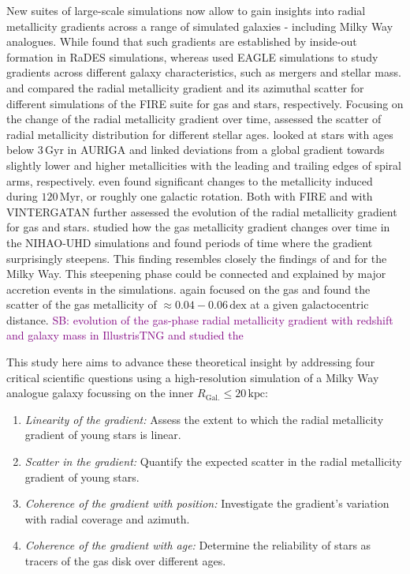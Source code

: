 \documentclass[fleqn,usenatbib]{mnras}
\newcommand{\SB}[1]{{\textcolor{purple}{SB: #1}}}
\begin{document}
New suites of large-scale simulations now allow to gain insights into radial metallicity gradients across a range of simulated galaxies - including Milky Way analogues. While \citet{Pilkington2012} found that such gradients are established by inside-out formation in RaDES simulations, whereas \citet{Tissera2019} used EAGLE simulations to study gradients across different galaxy characteristics, such as mergers and stellar mass. \citet{Bellardini2021} and \citet{Bellardini2022, Graf2024} compared the radial metallicity gradient and its azimuthal scatter for different simulations of the FIRE suite for gas and stars, respectively. Focusing on the change of the radial metallicity gradient over time, \citet{Grand2015} assessed the scatter of radial metallicity distribution for different stellar ages. \citet{Grand2016} looked at stars with ages below $3\,\mathrm{Gyr}$ in AURIGA and linked deviations from a global gradient towards slightly lower and higher metallicities with the leading and trailing edges of spiral arms, respectively. \citet{Grand2016} even found significant changes to the metallicity induced during $120\,\mathrm{Myr}$, or roughly one galactic rotation. Both \citet[][see their Fig. 6]{Ma2017} with FIRE and \citet[see their Fig. 9][]{Agertz2021} with VINTERGATAN further assessed the evolution of the radial metallicity gradient for gas and stars. \citet{Buck2023} studied how the gas metallicity gradient changes over time in the NIHAO-UHD simulations and found periods of time where the gradient surprisingly steepens. This finding resembles closely the findings of \citet{Lu2022} and \citet{Ratcliffe2023} for the Milky Way. This steepening phase could be connected and explained by major accretion events in the simulations. \citet{Khoperskov2023e} again focused on the gas and found the scatter of the gas metallicity of $\approx 0.04-0.06\,\mathrm{dex}$ at a given galactocentric distance. \SB{\citet{Hemler2021} evolution of the gas-phase radial metallicity gradient with redshift and galaxy mass in IllustrisTNG and \citet{Garcia2023} studied the }

This study here aims to advance these theoretical insight by addressing four critical scientific questions using a high-resolution simulation of a Milky Way analogue galaxy focussing on the inner $R_\mathrm{Gal.} \leq 20\,\mathrm{kpc}$:
\begin{enumerate}
\item \textit{Linearity of the gradient:} Assess the extent to which the radial metallicity gradient of young stars is linear.
\item \textit{Scatter in the gradient:} Quantify the expected scatter in the radial metallicity gradient of young stars.
\item \textit{Coherence of the gradient with position:} Investigate the gradient's variation with radial coverage and azimuth.
\item \textit{Coherence of the gradient with age:} Determine the reliability of stars as tracers of the gas disk over different ages.
\end{enumerate}
\end{document}
